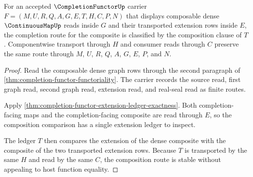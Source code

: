 \begin{theorem}
\label{thm:completion-functor-composition-route-stability}
For an accepted $\CompletionFunctorUp$ carrier $F=(M,U,R,Q,A,G,E,T,H,C,P,N)$ that displays composable dense $\ContinuousMapUp$ reads inside $G$ and their transported extension rows inside $E$, the completion route for the composite is classified by the composition clause of $T$. Componentwise transport through $H$ and consumer reads through $C$ preserve the same route through $M$, $U$, $R$, $Q$, $A$, $G$, $E$, $P$, and $N$.
\end{theorem}
\begin{proof}
Read the composable dense graph rows through the second paragraph of \autoref{thm:completion-functor-functoriality}. The carrier records the source read, first graph read, second graph read, extension read, and real-seal read as finite routes.

Apply \autoref{thm:completion-functor-extension-ledger-exactness}. Both completion-facing maps and the completion-facing composite are read through $E$, so the composition comparison has a single extension ledger to inspect.

The ledger $T$ then compares the extension of the dense composite with the composite of the two transported extension rows. Because $T$ is transported by the same $H$ and read by the same $C$, the composition route is stable without appealing to host function equality.
\end{proof}

